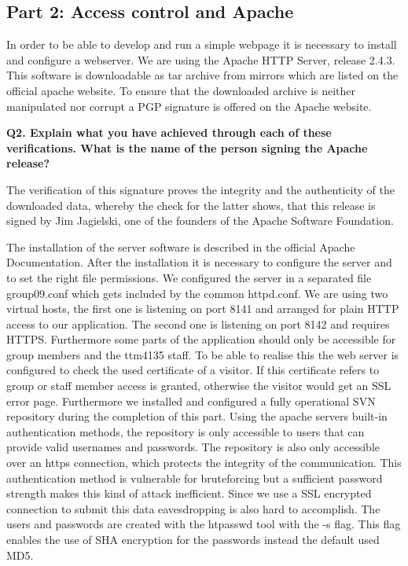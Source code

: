 \subsection {Part 2: Access control and Apache}


\noindent
In order to be able to develop and run a simple webpage it is necessary to install and configure a webserver. 
We are using  the Apache HTTP Server, release 2.4.3. This software is downloadable as tar archive from mirrors 
which are listed on the official apache website.\cite{quelle1} To ensure that the downloaded archive is neither manipulated 
nor corrupt a PGP signature is offered on the Apache website. 
\newline

\noindent
{\bf Q2. Explain what you have achieved through each of these verifications.
What is the name of the person signing the Apache release?}
\newline

\noindent
The verification of this signature proves the integrity and the authenticity of the downloaded data, 
whereby the check for the latter shows, that this release is signed by Jim Jagielski, 
one of the founders of the Apache Software Foundation. 
\newline

\noindent
The installation of the server software is described in the official Apache Documentation.\cite{quelle2}
After the installation it is necessary to configure the server and to set the right file permissions. 
We configured the server in a separated file group09.conf which gets included by the common httpd.conf. 
We are using two virtual hosts, the first one is listening on port 8141 and arranged for plain HTTP access to our application.
The second one is listening on port 8142 and requires HTTPS. 
Furthermore some parts of the application should only be accessible for group members and the ttm4135 staff. To be able to realise this 
the web server is configured to check the used certificate of a visitor. 
If this certificate refers to group or staff member access is granted, 
otherwise the visitor would get an SSL error page. 
\newline
\noindent
Furthermore we installed and configured a fully operational SVN repository during the completion of this part.
Using the apache servers built-in authentication methods, the repository is only accessible to users that can provide valid usernames and passwords. The repository is also only accessible over an https connection, which protects the integrity of the communication. This authentication method is vulnerable for bruteforcing but a sufficient password strength makes this kind of attack inefficient. Since we use a SSL encrypted connection to submit this data eavesdropping is also hard to accomplish. The users and passwords are created with the htpasswd tool with the -s flag. This flag enables the use of SHA encryption for the passwords instead the default used MD5.
\newline

